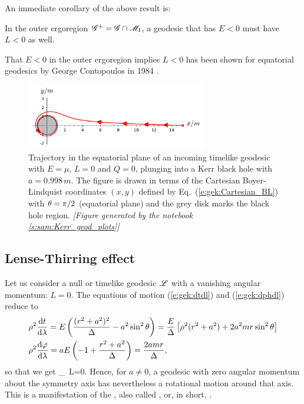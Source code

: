 An immediate corollary of the above result is:
\begin{greybox}
In the outer ergoregion
$\mathscr{G}^+ = \mathscr{G}\cap \mathscr{M}_{\rm I}$, a geodesic that has $E < 0$
must have $L<0$ as well.
\end{greybox}

\begin{hist}
That $E < 0$ in the outer ergoregion implies $L<0$ has been shown for
equatorial geodesics by George Contopoulos in 1984 \cite{Conto84}.
\end{hist}

\begin{figure}
\centerline{\includegraphics[width=0.7\textwidth]{gek_frame_dragging.pdf}}
\caption[]{\label{f:gek:frame_dragging} \footnotesize
Trajectory in the equatorial plane of an incoming timelike geodesic with
$E = \mu$, $L=0$ and $Q=0$, plunging into a Kerr black hole with $a = 0.998 \, m$.
The figure is drawn in terms
of the Cartesian Boyer-Lindquist coordinates $(x,y)$ defined by
Eq.~(\ref{e:gek:Cartesian_BL}) with $\theta=\pi/2$ (equatorial plane)
and the grey disk marks the black hole region.
\textsl{[Figure generated by the notebook \ref{s:sam:Kerr_geod_plots}]}
}
\end{figure}


\subsection{Lense-Thirring effect} \label{s:gek:Lense-Thirring}

Let us consider a null or timelike geodesic $\mathscr{L}$ with a vanishing angular
momentum: $L=0$. The equations of motion (\ref{e:gek:dtdl}) and (\ref{e:gek:dphdl})
reduce to
\begin{align}
& \rho^2 \frac{\mathrm{d} t}{\mathrm{d} \lambda} = E \left( \frac{(r^2 + a^2)^2}{\Delta}   - a^2 \sin^2\theta \right)
= \frac{E}{\Delta} \left[ \rho^2(r^2 + a^2) + 2 a^2 m r \sin^2\theta \right] \nonumber \\
& \rho^2 \frac{\mathrm{d} \varphi}{\mathrm{d} \lambda}  = a E \left( - 1 + \frac{r^2 + a^2}{\Delta} \right)
 = \frac{2 a m r}{\Delta} , \nonumber
\end{align}
so that we get
\be \label{e:gek:dphdt_frame_dragging}
     _{\ L=0}.
\ee
Hence, for $a\neq 0$, a geodesic with zero angular momentum about the
symmetry axis has nevertheless a rotational motion around that axis.
This is a manifestation of the ,
also called , or, in short, .


